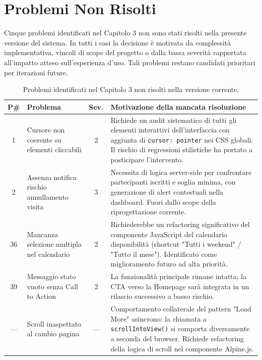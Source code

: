 \section{Problemi Non Risolti}
\label{sec:problemi_aperti}

Cinque problemi identificati nel Capitolo 3 non sono stati risolti nella presente versione del sistema. In tutti i casi la decisione è motivata da complessità implementativa, vincoli di scope del progetto o dalla bassa severità rapportata all'impatto atteso sull'esperienza d'uso. Tali problemi restano candidati prioritari per iterazioni future.

\begin{table}[H]
\centering
\renewcommand{\arraystretch}{1.5}
\small
\begin{tabular}{|c|p{3.5cm}|c|p{7cm}|}
\hline
\textbf{P\#} & \textbf{Problema} & \textbf{Sev.} & \textbf{Motivazione della mancata risoluzione} \\ \hline
1  & Cursore non coerente su elementi cliccabili & 2 & Richiede un audit sistematico di tutti gli elementi interattivi dell'interfaccia con aggiunta di \texttt{cursor: pointer} nei CSS globali. Il rischio di regressioni stilistiche ha portato a posticipare l'intervento. \\ \hline
2  & Assenza notifica rischio annullamento visita & 3 & Necessita di logica server-side per confrontare partecipanti iscritti e soglia minima, con generazione di alert contestuali nella dashboard. Fuori dallo scope della riprogettazione corrente. \\ \hline
36 & Mancanza selezione multipla nel calendario  & 2 & Richiederebbe un refactoring significativo del componente JavaScript del calendario disponibilità (shortcut "Tutti i weekend" / "Tutto il mese"). Identificato come miglioramento futuro ad alta priorità. \\ \hline
39 & Messaggio stato vuoto senza Call to Action  & 2 & La funzionalità principale rimane intatta; la CTA verso la Homepage sarà integrata in un rilascio successivo a basso rischio. \\ \hline
—  & Scroll inaspettato al cambio pagina         & — & Comportamento collaterale del pattern "Load More" asincrono: la chiamata a \texttt{scrollIntoView()} si comporta diversamente a seconda del browser. Richiede refactoring della logica di scroll nel componente Alpine.js. \\ \hline
\end{tabular}
\caption{Problemi identificati nel Capitolo 3 non risolti nella versione corrente.}
\label{tab:problemi_aperti}
\end{table}
